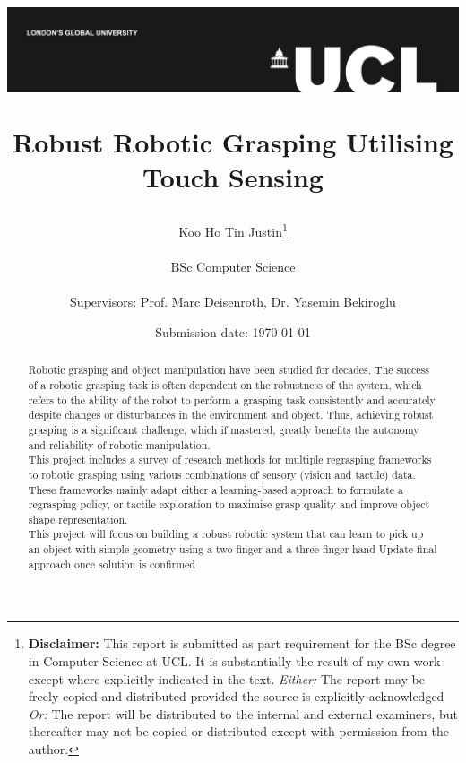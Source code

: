 \documentclass[a4paper]{report}
\title{{\vspace{-14em} \includegraphics[scale=0.4]{docs/Project Report/Media/ucl_logo.png}}\\
\vspace{2cm}
\begin{adjustwidth}{1cm}{1cm}
    \centering
    \Huge Robust Robotic Grasping Utilising Touch Sensing
\end{adjustwidth}}
\date{Submission date: \today}
\author{Koo Ho Tin Justin\thanks{
{\bf Disclaimer:}
This report is submitted as part requirement for the BSc degree in Computer Science at UCL. It is
substantially the result of my own work except where explicitly indicated in the text.
\emph{Either:} The report may be freely copied and distributed provided the source is explicitly acknowledged
\newline  %
\emph{Or:}\newline
The report will be distributed to the internal and external examiners, but thereafter may not be copied or distributed except with permission from the author.}
\\ \\
BSc Computer Science\\ \\
Supervisors: Prof. Marc Deisenroth, Dr. Yasemin Bekiroglu}
\theoremstyle{definition}
\begin{document}
\onehalfspacing
\maketitle

\begin{abstract}
Robotic grasping and object manipulation have been studied for decades. The success of a robotic grasping task is often dependent on the robustness of the system, which refers to the ability of the robot to perform a grasping task consistently and accurately despite changes or disturbances in the environment and object. Thus, achieving robust grasping is a significant challenge, which if mastered, greatly benefits the autonomy and reliability of robotic manipulation.\\

This project includes a survey of research methods for multiple regrasping frameworks to robotic grasping using various combinations of sensory (vision and tactile) data. These frameworks mainly adapt either a learning-based approach to formulate a regrasping policy, or tactile exploration to maximise grasp quality and improve object shape representation.\\

This project will focus on building a robust robotic system that can learn to pick up an object with simple geometry using a two-finger and a three-finger hand {\color{red} Update final approach once solution is confirmed}
\end{abstract}


\renewcommand\abstractname{Acknowledgments}
\begin{abstract}
    
\end{abstract}


\tableofcontents
\setcounter{page}{1}


\end{document}

